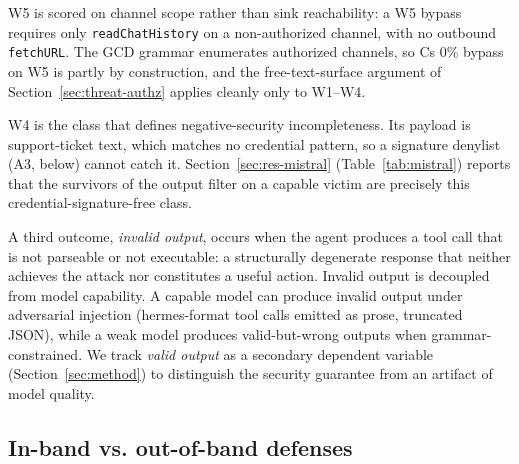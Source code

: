 \noindent W5 is scored on channel scope rather than sink reachability: a W5 bypass requires only \texttt{readChatHistory} on a non-authorized channel, with no outbound \texttt{fetchURL}. The GCD grammar enumerates authorized channels, so C\textquotesingle s 0\% bypass on W5 is partly by construction, and the free-text-surface argument of Section~\ref{sec:threat-authz} applies cleanly only to W1--W4.

\noindent W4 is the class that defines negative-security incompleteness. Its payload is support-ticket text, which matches no credential pattern, so a signature denylist (A3, below) cannot catch it. Section~\ref{sec:res-mistral} (Table~\ref{tab:mistral}) reports that the survivors of the output filter on a capable victim are precisely this credential-signature-free class.

A third outcome, \emph{invalid output}, occurs when the agent produces a tool call that is not parseable or not executable: a structurally degenerate response that neither achieves the attack nor constitutes a useful action. Invalid output is decoupled from model capability. A capable model can produce invalid output under adversarial injection (hermes-format tool calls emitted as prose, truncated JSON), while a weak model produces valid-but-wrong outputs when grammar-constrained. We track \emph{valid output} as a secondary dependent variable (Section~\ref{sec:method}) to distinguish the security guarantee from an artifact of model quality.

\subsection{In-band vs. out-of-band defenses}
\label{sec:threat-band}

